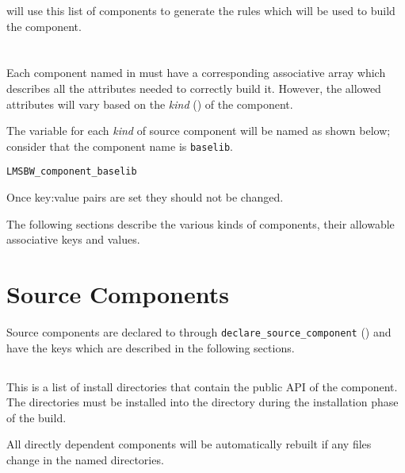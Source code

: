 \lmsbw will use this list of components to generate the rules which
will be used to build the component.

\section{}

Each component named in \lmsbwcomponents must have a corresponding
associative array which describes all the attributes needed to
correctly build it.  However, the allowed attributes will vary based
on the \emph{kind} () of the component.

The \make variable for each \emph{kind} of source component will be
named as shown below; consider that the component name is \texttt{baselib}.

\begin{verbatim}
LMSBW_component_baselib
\end{verbatim}

Once key:value pairs are set they should not be changed.

The following sections describe the various kinds of components, their
allowable associative keys and values.

\section{Source Components}

Source components are declared to \lmsbw through
\texttt{declare\_source\_component}
() and have the keys which are
described in the following sections.

\subsection{}\label{variables:api}

This is a list of install directories that contain the public API of
the component.  The directories must be installed into the \destdir
directory during the installation phase of the build.

All directly dependent components will be automatically rebuilt if any
files change in the named directories.

